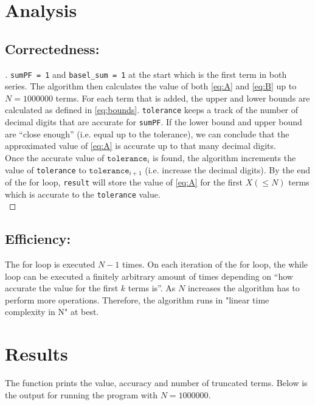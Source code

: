 \documentclass[11pt]{report}
\begin{document}


\section{Analysis}
\subsection{Correctedness:}
\begin{proof}[\unskip\nopunct]
\texttt{sumPF = 1} and \texttt{basel\_sum = 1} at the start which is the first term in both series. The algorithm then calculates the value of both \eqref{eq:A} and \eqref{eq:B} up to $N=1000000$ terms. For each term that is added, the upper and lower bounds are calculated as defined in \eqref{eq:bounds}. \texttt{tolerance} keeps a track of the number of decimal digits that are accurate for \texttt{sumPF}. If the lower bound and upper bound are ``close enough'' (i.e. equal up to the tolerance), we can conclude that the approximated value of \eqref{eq:A} is accurate up to that many decimal digits. \\

Once the accurate value of $\texttt{tolerance}_{i}$ is found, the algorithm increments the value of \texttt{tolerance} to $\texttt{tolerance}_{i+1}$ (i.e. increase the decimal digits). By the end of the for loop, \texttt{result} will store the value of \eqref{eq:A} for the first $X (\leq N)$ terms which is accurate to the \texttt{tolerance} value. \\
\end{proof}

\subsection{Efficiency:}
The for loop is executed $N-1$ times. On each iteration of the for loop, the while loop can be executed a finitely arbitrary amount of times depending on ``how accurate the value for the first $k$ terms is''. As $N$ increases the algorithm has to perform more operations. Therefore, the algorithm runs in "linear time complexity in N" at best.

\section{Results}
The function prints the value, accuracy and number of truncated terms. Below is the output for running the program with $N=1000000$.
\end{document}
